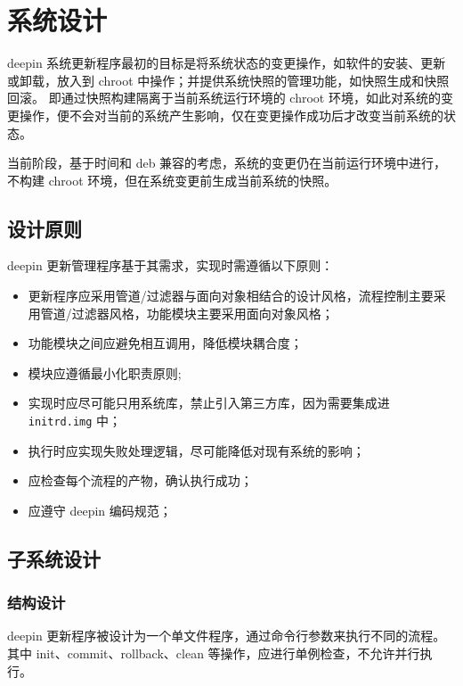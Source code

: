 \documentclass{utart}
\begin{document}
\section{系统设计}
deepin 系统更新程序最初的目标是将系统状态的变更操作，如软件的安装、更新或卸载，放入到 chroot 中操作；并提供系统快照的管理功能，如快照生成和快照回滚。
即通过快照构建隔离于当前系统运行环境的 chroot 环境，如此对系统的变更操作，便不会对当前的系统产生影响，仅在变更操作成功后才改变当前系统的状态。

当前阶段，基于时间和 deb 兼容的考虑，系统的变更仍在当前运行环境中进行，不构建 chroot 环境，但在系统变更前生成当前系统的快照。

\subsection{设计原则}
deepin 更新管理程序基于其需求，实现时需遵循以下原则：
\begin{itemize}[leftmargin=4em]
\item 更新程序应采用管道/过滤器与面向对象相结合的设计风格，流程控制主要采用管道/过滤器风格，功能模块主要采用面向对象风格；
\item 功能模块之间应避免相互调用，降低模块耦合度；
\item 模块应遵循最小化职责原则;
\item 实现时应尽可能只用系统库，禁止引入第三方库，因为需要集成进 \texttt{initrd.img} 中；
\item 执行时应实现失败处理逻辑，尽可能降低对现有系统的影响；
\item 应检查每个流程的产物，确认执行成功；
\item 应遵守 deepin 编码规范；
\end{itemize}

\subsection{子系统设计}
\subsubsection{结构设计}
deepin 更新程序被设计为一个单文件程序，通过命令行参数来执行不同的流程。
其中 init、commit、rollback、clean 等操作，应进行单例检查，不允许并行执行。
\end{document}
